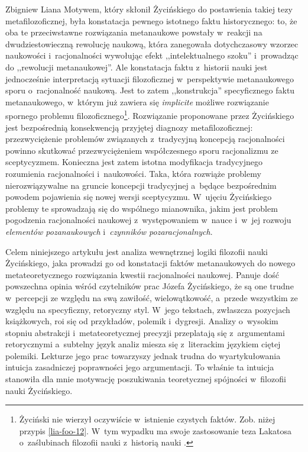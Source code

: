 \begin{artplenv}{Zbigniew Liana}
Motywem, który skłonił Życińskiego do postawienia takiej tezy metafilozoficznej, była konstatacja pewnego istotnego
faktu historycznego: to, że oba te przeciwstawne rozwiązania metanaukowe powstały w~reakcji na dwudziestowieczną
rewolucję naukową, która zanegowała dotychczasowy wzorzec naukowości i~racjonalności wywołując efekt ,,intelektualnego
szoku'' i~prowadząc do ,,rewolucji metanaukowej''. Ale konstatacja faktu z~historii nauki jest jednocześnie interpretacją
sytuacji filozoficznej w~perspektywie metanaukowego sporu o~racjonalność naukową. Jest to zatem ,,konstrukcja''
specyficznego faktu metanaukowego, w~którym już zawiera się \textit{implicite} możliwe rozwiązanie spornego problemu
filozoficznego\footnote{Życiński nie wierzył oczywiście w~istnienie czystych faktów. Zob. niżej przypis \ref{lia-foo-12}. W~tym
wypadku ma swoje zastosowanie teza Lakatosa o~zaślubinach filozofii nauki z~historią nauki
\parencites[zob.][s.~121n]{zycinski_jezyk_1983}[s.~26]{zycinski_structure_1988}[s.~47]{zycinski_struktura_2013}.
}. Rozwiązanie proponowane przez
Życińskiego jest bezpośrednią konsekwencją przyjętej diagnozy metafilozoficznej: przezwyciężenie problemów związanych z~tradycyjną
koncepcją racjonalności powinno skutkować przezwyciężeniem współczesnego sporu racjonalizmu ze sceptycyzmem.
Konieczna jest zatem istotna modyfikacja tradycyjnego rozumienia racjonalności i~naukowości. Taka, która rozwiąże
problemy nierozwiązywalne na gruncie koncepcji tradycyjnej a~będące bezpośrednim powodem pojawienia się nowej wersji
sceptycyzmu. W~ujęciu Życińskiego problemy te sprowadzają się do wspólnego mianownika, jakim jest problem pogodzenia
racjonalności naukowej z~występowaniem w~nauce i~w~jej rozwoju \textit{elementów pozanaukowych} i~\textit{czynników
pozaracjonalnych}.

Celem niniejszego artykułu jest analiza wewnętrznej logiki filozofii nauki Życińskiego, jaka prowadzi go od konstatacji
faktów metanaukowych do nowego metateoretycznego rozwiązania kwestii racjonalności naukowej. Panuje dość powszechna
opinia wśród czytelników prac Józefa Życińskiego, że są one trudne w~percepcji ze względu na swą zawiłość,
wielowątkowość, a~przede wszystkim ze względu na specyficzny, retoryczny styl. W~jego tekstach, zwłaszcza pozycjach
książkowych, roi się od przykładów, polemik i~dygresji. Analizy o~wysokim stopniu abstrakcji i~metateoretycznej
precyzji przeplatają się z~argumentami retorycznymi a~subtelny język analiz miesza się z~literackim językiem ciętej
polemiki. Lekturze jego prac towarzyszy jednak trudna do wyartykułowania intuicja zasadniczej poprawności jego
argumentacji. To właśnie ta intuicja stanowiła dla mnie motywację poszukiwania teoretycznej spójności w~filozofii nauki
Życińskiego.


\end{artplenv}
